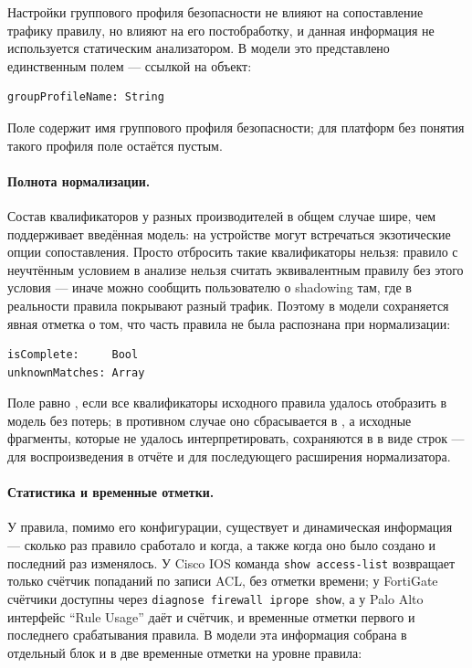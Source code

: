 Настройки группового профиля безопасности не влияют на сопоставление трафику правилу, но влияют на его постобработку, и данная информация не используется статическим анализатором. В модели это представлено единственным полем --- ссылкой на объект:

\begin{lstlisting}[style=schemastyle]
groupProfileName: String
\end{lstlisting}

Поле содержит имя группового профиля безопасности; для платформ без понятия такого профиля поле остаётся пустым.

\paragraph{Полнота нормализации.} Состав квалификаторов у разных производителей в общем случае шире, чем поддерживает введённая модель: на устройстве могут встречаться экзотические опции сопоставления. Просто отбросить такие квалификаторы нельзя: правило с неучтённым условием в анализе нельзя считать эквивалентным правилу без этого условия --- иначе можно сообщить пользователю о shadowing там, где в реальности правила покрывают разный трафик. Поэтому в модели сохраняется явная отметка о том, что часть правила не была распознана при нормализации:

\begin{lstlisting}[style=schemastyle]
isComplete:     Bool
unknownMatches: Array
\end{lstlisting}

Поле  равно , если все квалификаторы исходного правила удалось отобразить в модель без потерь; в противном случае оно сбрасывается в , а исходные фрагменты, которые не удалось интерпретировать, сохраняются в  в виде строк --- для воспроизведения в отчёте и для последующего расширения нормализатора.

\paragraph{Статистика и временные отметки.} У правила, помимо его конфигурации, существует и динамическая информация --- сколько раз правило сработало и когда, а также когда оно было создано и последний раз изменялось. У Cisco IOS команда \texttt{show access-list} возвращает только счётчик попаданий по записи ACL, без отметки времени; у FortiGate счётчики доступны через \texttt{diagnose firewall iprope show}, а у Palo Alto интерфейс ``Rule Usage'' даёт и счётчик, и временные отметки первого и последнего срабатывания правила. В модели эта информация собрана в отдельный блок  и в две временные отметки на уровне правила:

